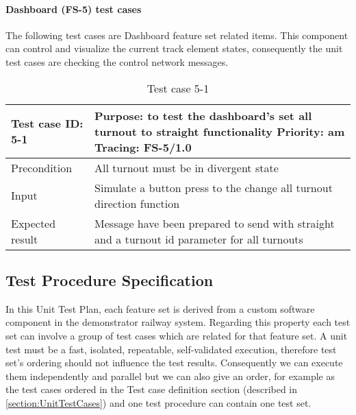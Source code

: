 \paragraph{Dashboard (FS-5) test cases} The following test cases are Dashboard feature set related items. This component can control and visualize the current track element states, consequently the unit test cases are checking the control network messages.
\begin{table}[H]
	\caption{Test case 5-1}
	\label{table:TCase-FS5-01}
	\begin{center}
		\renewcommand{\arraystretch}{1.8}
		\begin{tabu} 
			to 0.9 \textwidth
			{  X[0.3, l] X[l] }
			\toprule
			Test case ID: 5-1 & Purpose: to test the dashboard's set all turnout to straight functionality  \newline Priority: am \newline Tracing: FS-5/1.0 \\ \midrule
			Precondition      & All turnout must be in divergent state                                                                                       \\
			Input             & Simulate a button press to the change all turnout direction function                                                         \\
			Expected result   & Message have been prepared to send with straight and a turnout id parameter for all turnouts                                 \\ \bottomrule
		\end{tabu}
	\end{center}
\end{table}

\subsection{Test Procedure Specification}
In this Unit Test Plan, each feature set is derived from a custom software component in the demonstrator railway system. Regarding this property each test set can involve a group of test cases which are related for that feature set. A unit test must be a fast, isolated, repeatable, self-validated execution, therefore test set's ordering should not influence the test results. Consequently we can execute them independently and parallel but we can also give an order, for example as the test cases ordered in the Test case definition section (described in \autoref{section:UnitTestCases}) and one test procedure can contain one test set. 

